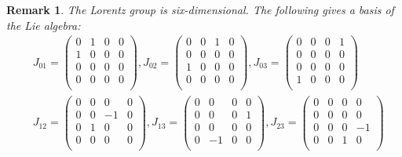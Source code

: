 \documentclass[a4paper,10pt]{amsart}
\newtheorem{remark}{Remark}[section]
\begin{document}
\begin{remark}
   The Lorentz group is six-dimensional. The following gives a basis of
   the Lie algebra:
   \begin{align*}
       &J_{01} = \begin{pmatrix}
           0 & 1 & 0 & 0\\
           1 & 0 & 0 & 0\\
           0 & 0 & 0 & 0\\
           0 & 0 & 0 & 0 \\
       \end{pmatrix},
        J_{02} = \begin{pmatrix}
           0 & 0 & 1 & 0\\
           0 & 0 & 0 & 0\\
           1 & 0 & 0 & 0\\
           0 & 0 & 0 & 0 \\
       \end{pmatrix},
        J_{03} = \begin{pmatrix}
           0 & 0 & 0 & 1\\
           0 & 0 & 0 & 0\\
           0 & 0 & 0 & 0\\
           1 & 0 & 0 & 0 \\
       \end{pmatrix} \\
        &J_{12} = \begin{pmatrix}
           0 & 0 & 0 & 0\\
           0 & 0 & -1 & 0\\
           0 & 1 & 0 & 0\\
           0 & 0 & 0 & 0 \\
       \end{pmatrix},
        J_{13} = \begin{pmatrix}
           0 & 0 & 0 & 0\\
           0 & 0 & 0 & 1\\
           0 & 0 & 0 & 0\\
           0 & -1 & 0 & 0 \\
       \end{pmatrix},
        J_{23} = \begin{pmatrix}
           0 & 0 & 0 & 0\\
           0 & 0 & 0 & 0\\
           0 & 0 & 0 & -1\\
           0 & 0 & 1 & 0 \\

\end{pmatrix}
\end{align*}
\end{remark}
\end{document}
